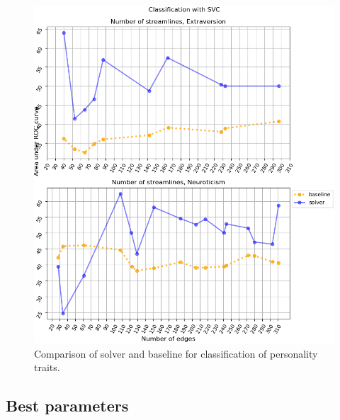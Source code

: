 \documentclass[msthesis.tex]{subfiles}
\begin{document}
\begin{figure}
    \centering
    \includegraphics[width=\textwidth]{images/persona_comp.png}
    \caption{Comparison of solver and baseline for classification of personality traits.}
    \label{fig:persona_com}
\end{figure}

\subsection{Best parameters}
\end{document}

